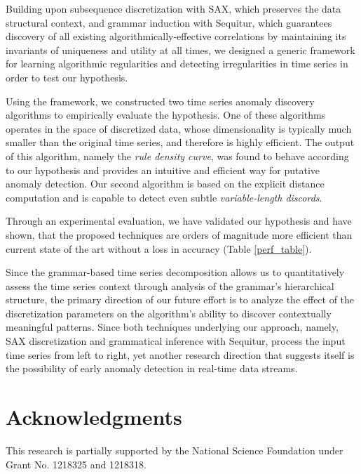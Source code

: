 \documentclass{sig-alternate}
\begin{document}
Building upon subsequence discretization with SAX, which preserves the data structural context, and grammar induction with Sequitur, which guarantees discovery of all existing algorithmically-effective correlations by maintaining its invariants of uniqueness and utility at all times, we designed a generic framework for learning algorithmic regularities and detecting irregularities in time series in order to test our hypothesis. 

Using the framework, we constructed two time series anomaly discovery algorithms to empirically evaluate the hypothesis. One of these algorithms operates in the space of discretized data, whose dimensionality is typically much smaller than the original time series, and therefore is highly efficient. The output of this algorithm, namely the \textit{rule density curve}, was found to behave according to our hypothesis and provides an intuitive and efficient way for putative anomaly detection. Our second algorithm is based on the explicit distance computation and is capable to detect even subtle \textit{variable-length discords}.

Through an experimental evaluation, we have validated our hypothesis and have shown, that the proposed techniques are orders of magnitude more efficient than current state of the art without a loss in accuracy (Table \ref{perf_table}).

Since the grammar-based time series decomposition allows us to quantitatively assess the time series context through analysis of the grammar's hierarchical structure, the primary direction of our future effort is to analyze the effect of the discretization parameters on the algorithm's ability to discover contextually meaningful patterns. Since both techniques underlying our approach, namely, SAX discretization and grammatical inference with Sequitur, process the input time series from left to right, yet another research direction that suggests itself is the possibility of early anomaly detection in real-time data streams.

\section{Acknowledgments}
This research is partially supported by the National Science Foundation under Grant No. 1218325 and 1218318.
\end{document}
